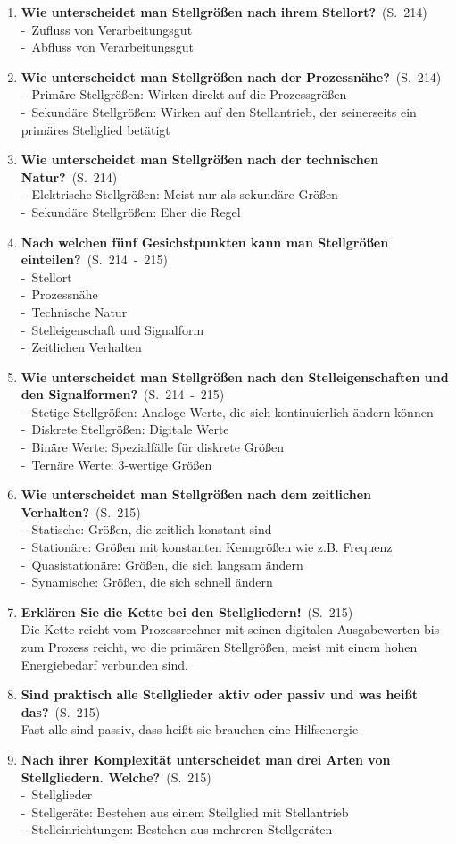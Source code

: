 \documentclass[a4paper,12pt]{article}
\newcommand{\question}[3]{\pagebreak[3]\item {\textbf{#1?}}\ (S.\ #2)#3}
\newcommand{\statement}[3]{\pagebreak[3]\item {\textbf{#1!}}\ (S.\ #2)#3}
\newcommand{\catchword}[1]{\\-\ #1}
\newcommand{\normaltext}[1]{\\#1}
\newcommand{\page}[1]{#1}
\newcommand{\pages}[2]{#1\ -\ #2}
\begin{document}
\begin{enumerate}
  \question{Wie unterscheidet man Stellgrößen nach ihrem Stellort}{\page{214}}
  {
    \catchword{Zufluss von Verarbeitungsgut}
    \catchword{Abfluss von Verarbeitungsgut}
  }

  \question{Wie unterscheidet man Stellgrößen nach der Prozessnähe}{\page{214}}
  {
    \catchword{Primäre Stellgrößen: Wirken direkt auf die Prozessgrößen}
    \catchword{Sekundäre Stellgrößen: Wirken auf den Stellantrieb, der seinerseits
               ein primäres Stellglied betätigt}
  }

  \question{Wie unterscheidet man Stellgrößen nach der technischen Natur}{\page{214}}
  {
    \catchword{Elektrische Stellgrößen: Meist nur als sekundäre Größen}
    \catchword{Sekundäre Stellgrößen: Eher die Regel}
  }

  \question{Nach welchen fünf Gesichstpunkten kann man Stellgrößen einteilen}{\pages{214}{215}}
  {
    \catchword{Stellort}
    \catchword{Prozessnähe}
    \catchword{Technische Natur}
    \catchword{Stelleigenschaft und Signalform}
    \catchword{Zeitlichen Verhalten}
  }

  \question{Wie unterscheidet man Stellgrößen nach den Stelleigenschaften
            und den Signalformen}{\pages{214}{215}}
  {
    \catchword{Stetige Stellgrößen: Analoge Werte, die sich kontinuierlich ändern können}
    \catchword{Diskrete Stellgrößen: Digitale Werte}
    \catchword{Binäre Werte: Spezialfälle für diskrete Größen}
    \catchword{Ternäre Werte: 3-wertige Größen}
  }

  \question{Wie unterscheidet man Stellgrößen nach dem zeitlichen Verhalten}{\page{215}}
  {
    \catchword{Statische: Größen, die zeitlich konstant sind}
    \catchword{Stationäre: Größen mit konstanten Kenngrößen wie z.B. Frequenz}
    \catchword{Quasistationäre: Größen, die sich langsam ändern}
    \catchword{Synamische: Größen, die sich schnell ändern}
  }

  \statement{Erklären Sie die Kette bei den Stellgliedern}{\page{215}}
  {
    \normaltext{Die Kette reicht vom Prozessrechner mit seinen digitalen Ausgabewerten
                bis zum Prozess reicht, wo die primären Stellgrößen, meist mit einem hohen
                Energiebedarf verbunden sind.}
  }

  \question{Sind praktisch alle Stellglieder aktiv oder passiv und was heißt das}{\page{215}}
  {
    \normaltext{Fast alle sind passiv, dass heißt sie brauchen eine Hilfsenergie}
  }

  \question{Nach ihrer Komplexität unterscheidet man drei Arten von Stellgliedern. Welche}{\page{215}}
  {
    \catchword{Stellglieder}
    \catchword{Stellgeräte: Bestehen aus einem Stellglied mit Stellantrieb}
    \catchword{Stelleinrichtungen: Bestehen aus mehreren Stellgeräten}
  }


\end{enumerate}
\end{document}
